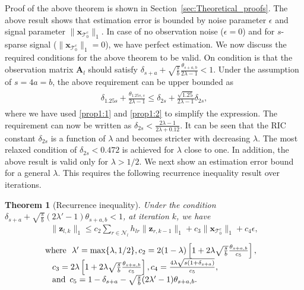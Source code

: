 \documentclass[journal]{IEEEtran}
\newcommand{\mbx}{\mathbf{x}}
\newcommand{\mbA}{\mathbf{A}}
\newcommand{\mbz}{\mathbf{z}}
\newcommand{\T}{\mathcal{T}}
\newtheorem{theorem}{Theorem}
\begin{document}
Proof of the above theorem is shown in Section~\ref{sec:Theoretical_proofs}. The above result shows that estimation error is bounded by noise parameter $\epsilon$ and signal parameter $\|\mbx_{\T_0^c}\|_1$. In case of no observation noise ($\epsilon=0$) and for $s$-sparse signal ($\|\mbx_{\T_0^c}\|_1=0$), we have perfect estimation. We now discuss the required conditions for the above theorem to be valid. On condition is that the observation matrix $\mbA_l$ should satisfy $\delta_{s+a}+\sqrt{\frac{s}{b}}\frac{\theta_{s+a,b}}{2\lambda -1} < 1$. Under the assumption of $s=4a=b$, the above requirement can be upper bounded as 
\begin{eqnarray*}
\begin{array}{l}
\delta_{1.25s}+\frac{\theta_{1.25s,s}}{2\lambda -1} \leq \delta_{2s}+\frac{\sqrt{1.25}}{2\lambda-1} \delta_{2s},
\end{array}
\end{eqnarray*} 
where we have used \eqref{prop1:1} and \eqref{prop1:2} to simplify the expression. The requirement can now be written as $\delta_{2s} < \frac{2\lambda-1}{2\lambda+0.12}$. It can be seen that the RIC constant $\delta_{2s}$ is a function of $\lambda$ and becomes stricter with decreasing $\lambda$. The most relaxed condition of $\delta_{2s} < 0.472 $ is achieved for $\lambda$ close to one. In addition, the above result is valid only for $\lambda > 1/2$. We next show an estimation error bound for a general $\lambda$. This requires the following recurrence inequality result over iterations.
\begin{theorem}[Recurrence inequality]
\label{thm:l1_recurrence_theorem2}
Under the condition $\delta_{s+a}+\sqrt{\frac{s}{b}} (2\lambda'  -1)\theta_{s+a,b} < 1$, at iteration $k$, we have
\begin{eqnarray*}
\|\mbz_{l,k}\| _1\leq c_2 \sum\limits_{r \in \mathcal{N}_l} h_{lr} \|\mbz_{r,k-1}\|_1+ c_3 \|\mbx_{\T_0^c}\|_1 + c_4 \epsilon,
\end{eqnarray*}
\begin{eqnarray*}
\begin{array}{l}
\hspace{-3mm}\text{where} \,\,\ \lambda' = \max\{\lambda,1/2\}, c_2 = 2(1-\lambda) \left[1 + 2\lambda \sqrt{\frac{s}{b}} \frac{\theta_{s+a,b}}{c_5}\right], \\
c_3 = 2\lambda \left[1 + 2\lambda \sqrt{\frac{s}{b}} \frac{\theta_{s+a,b}}{c_5}\right], c_4 = \frac{4 \lambda \sqrt{s(1+\delta_{s+a})}}{c_5}, \\
\text{and} \,\ c_5 = 1-\delta_{s+a}-\sqrt{\frac{s}{b}} (2\lambda' -1)\theta_{s+a,b}.
\end{array}
\end{eqnarray*}
\end{theorem}
\end{document}
